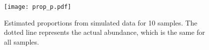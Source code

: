 

\begin{figure}[!htbp]
    \centering
    \texttt{[image: prop\_p.pdf]}
    \caption{Estimated proportions from simulated data for 10 samples.
             The dotted line represents the actual abundance, which is the same for 
             all samples.}
    \label{fig:proportions}
\end{figure}